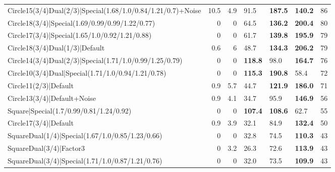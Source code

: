 \begin{tabular}{lrrlllr}
 Circle15(3/4)Dual(2/3)|Special(1.68/1.0/0.84/1.21/0.7)+Noise &         10.5 &            4.9 & 91.5           & \textbf{187.5} & \textbf{140.2} &           86 \\
 Circle18(3/4)|Special(1.69/0.99/0.99/1.22/0.77)              &          0   &            0   & 64.5           & \textbf{136.2} & \textbf{200.4} &           80 \\
 Circle17(3/4)|Special(1.65/1.0/0.92/1.21/0.88)               &          0   &            0   & 61.7           & \textbf{139.8} & \textbf{195.9} &           79 \\
 Circle18(3/4)Dual(1/3)|Default                               &          0.6 &            6   & 48.7           & \textbf{134.3} & \textbf{206.2} &           79 \\
 Circle14(3/4)Dual(2/3)|Special(1.71/1.0/0.99/1.25/0.79)      &          0   &            0   & \textbf{118.8} & 98.0           & \textbf{164.7} &           76 \\
 Circle10(3/4)Dual|Special(1.71/1.0/0.94/1.21/0.78)           &          0   &            0   & \textbf{115.3} & \textbf{190.8} & 58.4           &           72 \\
 Circle11(2/3)|Default                                        &          0.9 &            5.7 & 44.7           & \textbf{121.9} & \textbf{186.0} &           71 \\
 Circle13(3/4)|Default+Noise                                  &          0.9 &            4.1 & 34.7           & 95.9           & \textbf{146.9} &           56 \\
 Square|Special(1.7/0.99/0.81/1.24/0.92)                      &          0   &            0   & \textbf{107.4} & \textbf{108.6} & 62.7           &           55 \\
 Circle17(3/4)|Default                                        &          0.9 &            3.9 & 32.1           & 84.9           & \textbf{132.4} &           50 \\
 SquareDual(1/4)|Special(1.67/1.0/0.85/1.23/0.66)             &          0   &            0   & 32.8           & 74.5           & \textbf{110.3} &           43 \\
 SquareDual(3/4)|Factor3                                      &          0   &            3.2 & 26.3           & 72.6           & \textbf{113.9} &           43 \\
 SquareDual(3/4)|Special(1.71/1.0/0.87/1.21/0.76)             &          0   &            0   & 32.0           & 73.5           & \textbf{109.9} &           43 \\

\end{tabular}
